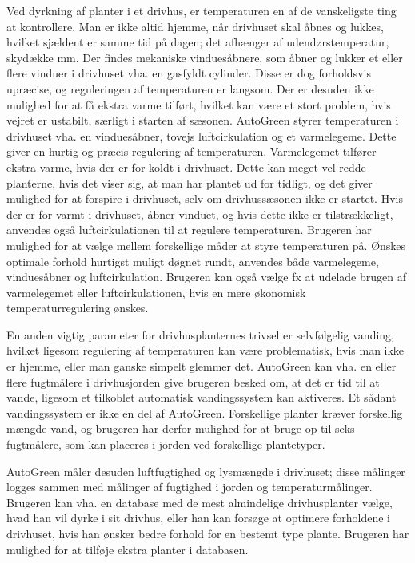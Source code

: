 Ved dyrkning af planter i et drivhus, er temperaturen en af de vanskeligste ting at kontrollere. Man er ikke altid hjemme, når drivhuset skal åbnes og lukkes, hvilket sjældent er samme tid på dagen; det afhænger af udendørstemperatur, skydække mm. 
Der findes mekaniske vinduesåbnere, som åbner og lukker et eller flere vinduer i drivhuset vha. en gasfyldt cylinder. 
Disse er dog forholdsvis upræcise, og reguleringen af temperaturen er langsom. Der er desuden ikke mulighed for at få ekstra varme tilført, hvilket kan være et stort problem, hvis vejret er ustabilt, særligt i starten af sæsonen. 
AutoGreen styrer temperaturen i drivhuset vha. en vinduesåbner, tovejs luftcirkulation og et varmelegeme. 
Dette giver en hurtig og præcis regulering af temperaturen. Varmelegemet tilfører ekstra varme, hvis der er for koldt i drivhuset. 
Dette kan meget vel redde planterne, hvis det viser sig, at man har plantet ud for tidligt, og det giver mulighed for at forspire i drivhuset, selv om drivhussæsonen ikke er startet. 
Hvis der er for varmt i drivhuset, åbner vinduet, og hvis dette ikke er tilstrækkeligt, anvendes også luftcirkulationen til at regulere temperaturen. 
Brugeren har mulighed for at vælge mellem forskellige måder at styre temperaturen på. Ønskes optimale forhold hurtigst muligt døgnet rundt, anvendes både varmelegeme, vinduesåbner og luftcirkulation. 
Brugeren kan også vælge fx at udelade brugen af varmelegemet eller luftcirkulationen, hvis en mere økonomisk temperaturregulering ønskes. 
 
En anden vigtig parameter for drivhusplanternes trivsel er selvfølgelig vanding, hvilket ligesom regulering af temperaturen kan være problematisk, hvis man ikke er hjemme, eller man ganske simpelt glemmer det. 
AutoGreen kan vha. en eller flere fugtmålere i drivhusjorden give brugeren besked om, at det er tid til at vande, ligesom et tilkoblet automatisk vandingssystem kan aktiveres. Et sådant vandingssystem er ikke en del af AutoGreen.
Forskellige planter kræver forskellig mængde vand, og brugeren har derfor mulighed for at bruge op til seks fugtmålere, som kan placeres i jorden ved forskellige plantetyper. 

AutoGreen måler desuden luftfugtighed og lysmængde i drivhuset; disse målinger logges sammen med målinger af fugtighed i jorden og temperaturmålinger. 
Brugeren kan vha. en database med de mest almindelige drivhusplanter vælge, hvad han vil dyrke i sit drivhus, eller han kan forsøge at optimere forholdene i drivhuset, hvis han ønsker bedre forhold for en bestemt type plante.  
Brugeren har mulighed for at tilføje ekstra planter i databasen. 

